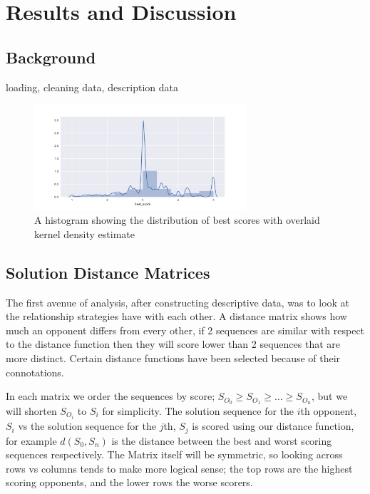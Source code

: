 \chapter{Results and Discussion}\label{ch:results}
\section{Background}
loading, cleaning data, description data

\begin{figure}[h]
    \includegraphics[width=0.7\textwidth, center]{./img/descriptive/best_score_hist.pdf}
    \caption{A histogram showing the distribution of best scores with overlaid kernel density estimate}\label{fig:best_score_hist}
\end{figure}

\section{Solution Distance Matrices}
The first avenue of analysis, after constructing descriptive data, was to look at the relationship strategies have with each other.
A distance matrix shows how much an opponent differs from every other, if 2 sequences are similar with respect to the distance function then they will score lower than 2 sequences that are more distinct.
Certain distance functions have been selected because of their connotations.

In each matrix we order the sequences by score; $S_{O_0}\ge S_{O_1} \ge \ldots \ge S_{O_n}$, but we will shorten $S_{O_i}$ to $S_{i}$ for simplicity.
The solution sequence for the $i$th opponent, $S_i$ vs the solution sequence for the $j$th, $S_j$ is scored using our distance function, for example $d(S_0,S_n)$ is the distance between the best and worst scoring sequences respectively.
The Matrix itself will be symmetric, so looking across rows vs columns tends to make more logical sense; the top rows are the highest scoring opponents, and the lower rows the worse scorers.

